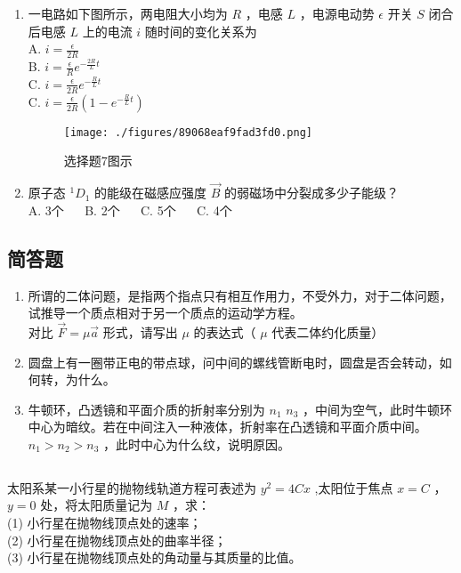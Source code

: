 \begin{enumerate}
\item 一电路如下图所示，两电阻大小均为 $R$ ，电感 $L$ ，电源电动势 $\epsilon$ 开关 $S$ 闭合后电感 $L$ 上的电流 $i$ 随时间的变化关系为\\

A. $i = \frac{\epsilon}{2R}$\\
B. $i = \frac{\epsilon}{R}e^{-\frac{2R}{L}t}$\\
C. $i = \frac{\epsilon}{2R}e^{-\frac{R}{L}t}$\\
C. $i = \frac{\epsilon}{2R}(1-e^{-\frac{R}{L}t})$\\
\begin{figure}[ht]
\centering
\texttt{[image: ./figures/89068eaf9fad3fd0.png]}
\caption{选择题7图示} \label{fig_CAS18_2}
\end{figure}
\item 原子态 $^{1}D_{1}$ 的能级在磁感应强度 $\vec{B}$ 的弱磁场中分裂成多少子能级？\\

A. 3个 $\quad$
B. 2个 $\quad$
C. 5个 $\quad$
C. 4个 $\quad$
\end{enumerate}

\subsection{简答题}

\begin{enumerate}

\item 所谓的二体问题，是指两个指点只有相互作用力，不受外力，对于二体问题，试推导一个质点相对于另一个质点的运动学方程。\\
对比 $\vec{F} = \mu \vec{a}$ 形式，请写出 $\mu$ 的表达式（ $\mu$ 代表二体约化质量）

\item 圆盘上有一圈带正电的带点球，问中间的螺线管断电时，圆盘是否会转动，如何转，为什么。

\item 牛顿环，凸透镜和平面介质的折射率分别为 $n_{1}$ $n_{3}$ ，中间为空气，此时牛顿环中心为暗纹。若在中间注入一种液体，折射率在凸透镜和平面介质中间。$n_{1}>n_{2}>n_{3}$ ，此时中心为什么纹，说明原因。

\end{enumerate}

\subsection{ }
太阳系某一小行星的抛物线轨道方程可表述为 $y^{2} = 4Cx$ ,太阳位于焦点 $x = C$ ，$y = 0$ 处，将太阳质量记为 $M$ ，求：\\
(1) 小行星在抛物线顶点处的速率；\\
(2) 小行星在抛物线顶点处的曲率半径；\\
(3) 小行星在抛物线顶点处的角动量与其质量的比值。\\

